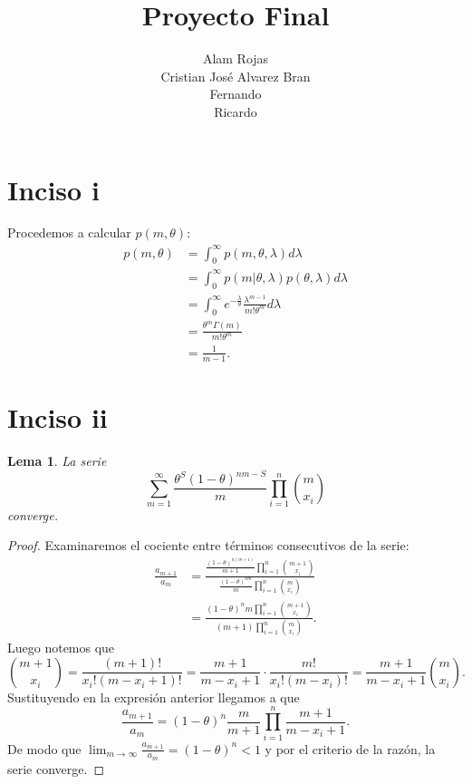 \documentclass[12 pt]{article}
\title{Proyecto Final}
\author{Alam Rojas\\
Cristian José Alvarez Bran \\
Fernando\\
Ricardo 
}
\date{}
\newtheorem{lema}{Lema}
\begin{document}
\maketitle



\section{Inciso i}
Procedemos a calcular $p(m,\theta)$: 
\begin{align*}
    p(m, \theta) &= \int_{0}^{\infty}p(m, \theta , \lambda)d\lambda\\
    &= \int_{0}^{\infty}p(m|\theta, \lambda)p(\theta, \lambda) d\lambda\\
    &= \int_{0}^{\infty}e^{-\frac{\lambda}{\theta}}\frac{\lambda^{m-1}}{m!\theta^m} d\lambda\\
    &=\frac{\theta^m\Gamma(m)}{m!\theta^m}\\
    &= \frac{1}{m-1}.
\end{align*}

\section{Inciso ii}

\begin{lema}
La serie 
\begin{equation*}
    \sum_{m=1}^{\infty}\frac{\theta^S(1-\theta)^{nm-S}}{m}\prod_{i=1}^{n}{{m}\choose{x_i}}
\end{equation*}
converge.
\end{lema}
\begin{proof}
Examinaremos el cociente entre términos consecutivos de la serie:
\begin{align*}
    \frac{a_{m+1}}{a_m} &=  
    \frac{\frac{(1-\theta)^{n(m+1)}}{m+1}\prod_{i=1}^{n}{{m+1}\choose{x_i}}}{ \frac{(1-\theta)^{nm}}{m}\prod_{i=1}^{n}{{m}\choose{x_i}}}\\
    &= \frac{(1-\theta)^{n}m\prod_{i=1}^{n}{{m+1}\choose{x_i}}}{(m+1)\prod_{i=1}^{n}{{m}\choose{x_i}}}.
\end{align*}
Luego notemos que 
\begin{equation*}
    {{m+1}\choose{x_i}} = \frac{(m+1)!}{x_i!(m-x_i+1)!} =  \frac{m+1}{m-x_i+1}\cdot\frac{m!}{x_i!(m-x_i)!} = \frac{m+1}{m-x_i+1}{{m}\choose{x_i}}.
\end{equation*}
Sustituyendo en la expresión anterior llegamos a que 
\begin{equation}
    \frac{a_{m+1}}{a_m} = (1-\theta)^n\frac{m}{m+1}\prod_{i=1}^{n} \frac{m+1}{m-x_i+1}.
\end{equation}
De modo que $\lim_{m\to \infty} \frac{a_{m+1}}{a_m} = (1-\theta)^n < 1$ y por el criterio de la razón, la serie converge.
\end{proof}
\end{document}
